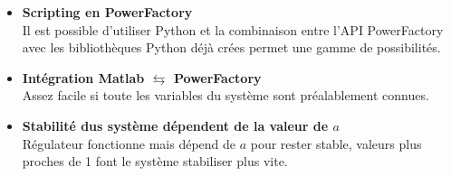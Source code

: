 \begin{itemize}
	\item \textbf{Scripting en PowerFactory}\\
	Il est possible d'utiliser Python et la combinaison entre l'API PowerFactory avec les bibliothèques Python déjà crées permet une gamme de possibilités.\\
	\item \textbf{Intégration Matlab $\mathbf{\leftrightarrows }$ PowerFactory}\\
	Assez facile si toute les variables du système sont préalablement connues.\\
	\item \textbf{Stabilité dus système dépendent de la valeur de $ a $}\\
	Régulateur fonctionne mais dépend de $ a $ pour rester stable, valeurs plus proches de 1 font le système stabiliser plus vite.
	
\end{itemize}